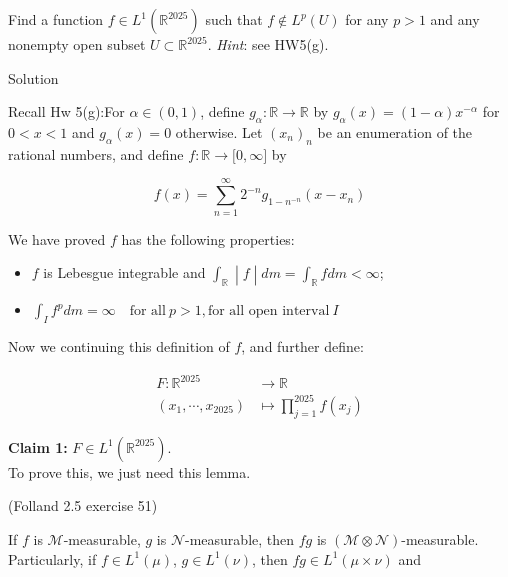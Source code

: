 \documentclass{qlnotes-export}
\begin{document}
Find a function \(f \in L^{1}({\mathbb{R}}^{2025})\) such that \(f \notin L^{p}(U)\) for any \(p > 1\) and any nonempty open subset \(U \subset {\mathbb{R}}^{2025}\). \emph{Hint}: see HW5(g).

\begin{qlsolution}{Solution}

Recall Hw 5(g):For \(\alpha \in (0,1)\), define \(g_{\alpha}:{\mathbb{R}}\rightarrow{\mathbb{R}}\) by \(g_{\alpha}(x) = (1 - \alpha)x^{- \alpha}\) for \(0 < x < 1\) and \(g_{\alpha}(x) = 0\) otherwise. Let \((x_{n})_{n}\) be an enumeration of the rational numbers, and define \(f:{\mathbb{R}}\rightarrow\lbrack 0,\infty\rbrack\) by

\[f(x) = \sum\limits_{n = 1}^{\infty}2^{- n}g_{1 - n^{- n}}(x - x_{n})\]

We have proved \(f\) has the following properties:

\begin{itemize}
\item
  \(f\) is Lebesgue integrable and \(\left. \int_{\mathbb{R}} \middle| f \middle| dm = \int_{\mathbb{R}}f dm < \infty \right.\);
\item
  \(\int_{I}f^{p} dm = \infty\quad\text{for all}\ p > 1,\text{for all open interval}\ I\)
\end{itemize}

Now we continuing this definition of \(f\), and further define:

\[\begin{matrix}
{F:{\mathbb{R}}^{2025}} & {\rightarrow{\mathbb{R}}} \\
{(x_{1},\cdots,x_{2025})} & {\mapsto\prod\limits_{j = 1}^{2025}f(x_{j})}
\end{matrix}\]

\textbf{Claim 1:} \(F \in L^{1}({\mathbb{R}}^{2025})\).\\
To prove this, we just need this lemma.

\begin{lemma}{(Folland 2.5 exercise 51)}\label{lem-hw08-on-l-p-spacecs-folland-2-5-exercise-51}

If \(f\) is \(\mathcal{M}\)-measurable, \(g\) is \(\mathcal{N}\)-measurable, then \(fg\) is \((\mathcal{M} \otimes \mathcal{N})\)-measurable.\\
Particularly, if \(f \in L^{1}(\mu)\), \(g \in L^{1}(\nu)\), then \(fg \in L^{1}(\mu \times \nu)\) and


\end{lemma}
\end{qlsolution}
\end{document}
